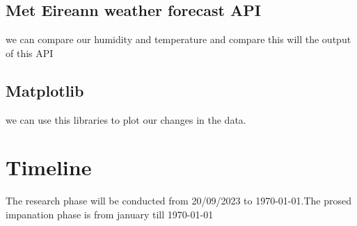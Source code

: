 \subsection{Met Eireann weather forecast API}
we can compare our humidity and temperature and compare this will the output of this  API
\subsection{Matplotlib}
we can use this libraries to plot our changes in the data.


\section{Timeline}
The research  phase will be  conducted from 20/09/2023 to \today.The prosed impanation phase is from january till \today